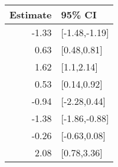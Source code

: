 \begin{tabular}{rl}
  \hline
Estimate & 95\% CI \\ 
  \hline
-1.33 & [-1.48,-1.19] \\ 
  0.63 & [0.48,0.81] \\ 
  1.62 & [1.1,2.14] \\ 
  0.53 & [0.14,0.92] \\ 
  -0.94 & [-2.28,0.44] \\ 
  -1.38 & [-1.86,-0.88] \\ 
  -0.26 & [-0.63,0.08] \\ 
  2.08 & [0.78,3.36] \\ 
   \hline
\end{tabular}

